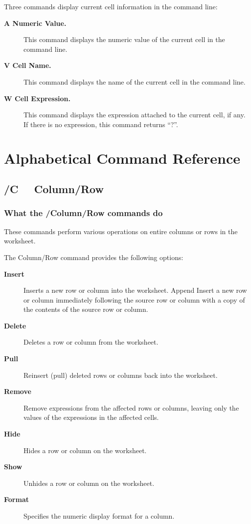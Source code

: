 Three commands display current cell information in the command line:
\begin{description}
\item[{\bf \ctrl A  Numeric Value.}]{  This command displays the numeric value of the current
cell in the command line.}

\item[{\bf \ctrl V  Cell Name.}]{  This command displays the name of the current cell in the
command line.}

\item[{\bf \ctrl W  Cell Expression.}]{  This command displays the expression attached to the
current cell, if any.  If there is no expression, this command returns 
``?''.}
\end{description}
\newpage
\section*{Alphabetical Command Reference}

\subsection*{/C \ \  Column/Row}
        
\subsubsection*{What the /Column/Row commands do}
These commands perform various operations on entire columns or rows in 
the worksheet.

The Column/Row command provides the following options:
\begin{description}
\item[{\bf Insert}]{  Inserts a new row or column into the worksheet.
        Append  Insert a new row or column immediately following the source 
row or column with a copy of the contents of the source row or 
column.}
\item[{\bf Delete}]{  Deletes a row or column from the worksheet.}
\item[{\bf Pull}]{Reinsert (pull) deleted rows or columns back into the
worksheet.}
\item[{\bf Remove}]{  Remove expressions from the affected rows or columns, leaving
only the values of the expressions in the affected cells.}
\item[{\bf  Hide}]{ Hides a row or column on the worksheet.}
\item[{\bf Show }]{Unhides a row or column on the worksheet.}
\item[{\bf Format}]{  Specifies the numeric display format for a column.}
\end{description}

